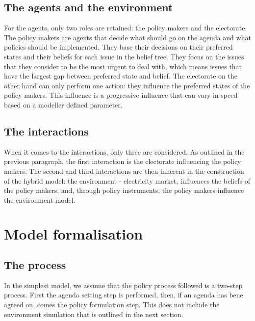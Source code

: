 \documentclass[11pt]{article}
\begin{document}

\subsection{The agents and the environment}

For the agents, only two roles are retained: the policy makers and the electorate. The policy makers are agents that decide what should go on the agenda and what policies should be implemented. They base their decisions on their preferred states and their beliefs for each issue in the belief tree. They focus on the issues that they consider to be the most urgent to deal with, which means issues that have the largest gap between preferred state and belief. The electorate on the other hand can only perform one action: they influence the preferred states of the policy makers. This influence is a progressive influence that can vary in speed based on a modeller defined parameter.


\subsection{The interactions}

When it comes to the interactions, only three are considered. As outlined in the previous paragraph, the first interaction is the electorate influencing the policy makers. The second and third interactions are then inherent in the construction of the hybrid model: the environment - electricity market, influences the beliefs of the policy makers, and, through policy instruments, the policy makers influence the environment model.



\section{Model formalisation}

\subsection{The process}

In the simplest model, we assume that the policy process followed is a two-step process. First the agenda setting step is performed, then, if an agenda has bene agreed on, comes the policy formulation step. This does not include the environment simulation that is outlined in the next section.
\end{document}
